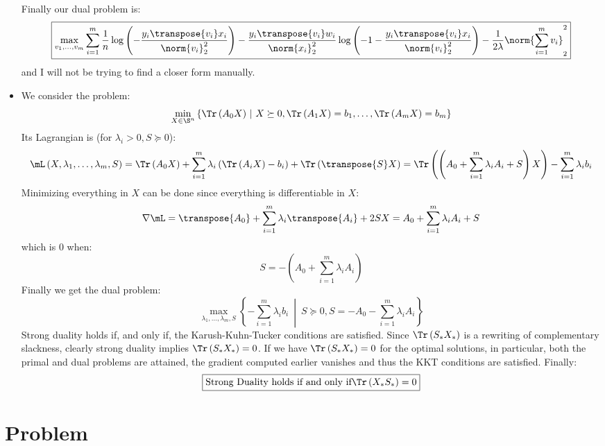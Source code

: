 \documentclass[math, info]{cours}
\begin{document}
\begin{itemize}
\begin{equation*}
		\end{equation*}
		Finally our dual problem is:
		\begin{equation*}
			\boxed{\max_{v_{1}, \ldots, v_{m}}\sum_{i = 1}^{m}\frac{1}{n} \log\left( -\frac{y_{i}\transpose{v_{i}}x_{i}}{\norm{v_{i}}_{2}^{2}} \right)- \frac{y_{i}\transpose{v_{i}}w_{i}}{\norm{x_{i}}_{2}^{2}}\log\left( -1 - \frac{y_{i}\transpose{v_{i}}x_{i}}{\norm{v_{i}}_{2}^{2}} \right) - \frac{1}{2\lambda} \norm{\sum_{i = 1}^{m}v_{i}}_{2}^{2}}
		\end{equation*}
		and I will not be trying to find a closer form manually.
	\item We consider the problem:
		\begin{equation*}
			\min_{X\in \S^{n}} \left\{ \Tr\left( A_{0}X \right)\ \middle|\ X \succeq 0, \Tr\left( A_{1}X \right) = b_{1}, \ldots, \Tr\left( A_{m}X \right) = b_{m} \right\}
		\end{equation*}
		Its Lagrangian is (for $\lambda_{i} > 0, S \succeq 0$):
		\begin{equation*}
			\mL\left( X, \lambda_{1}, \ldots, \lambda_{m}, S\right) = \Tr\left( A_{0}X \right) + \sum_{i = 1}^{m}\lambda_{i}\left( \Tr\left( A_{i}X \right) - b_{i} \right) + \Tr\left( \transpose{S}X \right) = \Tr\left( \left( A_{0} + \sum_{i = 1}^{m} \lambda_{i}A_{i} + S \right)X \right) - \sum_{i = 1}^{m}\lambda_{i}b_{i}
		\end{equation*}
		Minimizing everything in $X$ can be done since everything is differentiable in $X$:
		\begin{equation*}
			\nabla \mL = \transpose{A_{0}} + \sum_{i = 1}^{m}\lambda_{i}\transpose{A_{i}} + 2 SX = A_{0} + \sum_{i = 1}^{m}\lambda_{i}A_{i} + S
		\end{equation*}
		which is $0$ when:
		\begin{equation*}
			S = -\left( A_{0} + \sum_{i = 1}^{m} \lambda_{i}A_{i}\right)
		\end{equation*}
		Finally we get the dual problem:
		\begin{equation*}
			\boxed{\max_{\lambda_{1},\ldots, \lambda_{m}, S} \left\{ -\sum_{i = 1}^{m}\lambda_{i}b_{i}\ \middle| \ S \succeq 0, S = -A_{0} - \sum_{i = 1}^{m}\lambda_{i}A_{i} \right\}}
		\end{equation*}
		Strong duality holds if, and only if, the Karush-Kuhn-Tucker conditions are satisfied.
		Since $\Tr\left( S_{*}X_{*} \right)$ is a rewriting of complementary slackness, clearly strong duality implies $\Tr\left(  S_{*}X_{*} \right) = 0$.
		If we have $\Tr\left( S_{*}X_{*} \right) = 0$ for the optimal solutions, in particular, both the primal and dual problems are attained, the gradient computed earlier vanishes and thus the KKT conditions are satisfied.
		Finally:
		\begin{equation*}
			\boxed{\text{Strong Duality holds if and only if} \Tr\left( X_{*}S_{*} \right) = 0}
		\end{equation*}
\end{itemize}

\section{Problem}
\end{document}
